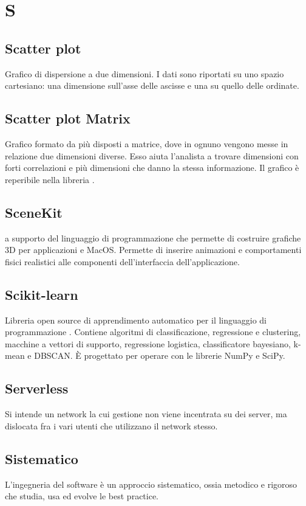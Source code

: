 \section*{S}
\markright{}
\subsection*{Scatter plot}
Grafico di dispersione a due dimensioni. I dati sono riportati su uno spazio cartesiano: una dimensione sull'asse delle ascisse e una su quello delle ordinate. 

\subsection*{Scatter plot Matrix}
Grafico formato da più  disposti a matrice, dove in ognuno vengono messe in relazione due dimensioni diverse. Esso aiuta l'analista a trovare dimensioni con forti correlazioni e più  dimensioni che danno la stessa informazione. Il grafico è reperibile nella libreria .

\subsection*{SceneKit}
 a supporto del linguaggio di programmazione  che permette di costruire grafiche 3D per applicazioni  e MacOS. Permette di inserire animazioni e comportamenti fisici realistici alle componenti dell'interfaccia dell'applicazione. 

\subsection*{Scikit-learn}
Libreria open source di apprendimento automatico per il linguaggio di programmazione . Contiene algoritmi di classificazione, regressione e clustering, macchine a vettori di supporto, regressione logistica, classificatore bayesiano, k-mean e DBSCAN. È progettato per operare con le librerie NumPy e SciPy. 

\subsection*{Serverless}
Si intende un network la cui gestione non viene incentrata su dei server, ma dislocata fra i vari utenti che utilizzano il network stesso.

\subsection*{Sistematico}
L'ingegneria del software è un approccio sistematico, ossia metodico e rigoroso che studia, usa ed evolve le best practice.

